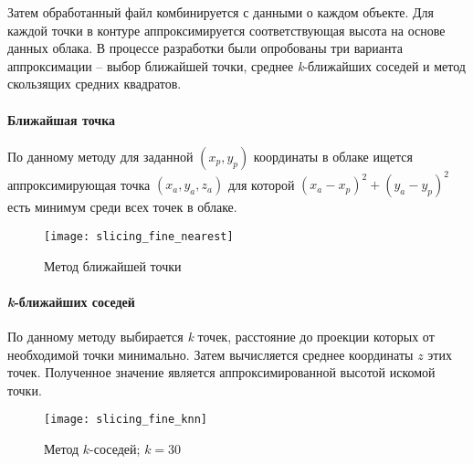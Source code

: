          Затем обработанный файл комбинируется с данными о каждом объекте. Для каждой точки в контуре аппроксимируется соответствующая высота на основе данных облака. В процессе разработки были опробованы три варианта аппроксимации -- выбор ближайшей точки, среднее \textit{k}-ближайших соседей и метод скользящих средних квадратов.
         
         \paragraph{Ближайшая точка}
         По данному методу для заданной $ (x_p,y_p) $ координаты в облаке ищется аппроксимирующая точка $ (x_a, y_a, z_a) $ для которой $ (x_a-x_p)^2 + (y_a-y_p)^2 $ есть минимум среди всех точек в облаке.
         
         \begin{figure}[H]
             \centering
             \texttt{[image: slicing\_fine\_nearest]}
             \caption{Метод ближайшей точки}
             \label{pic:slicing_nearest}
         \end{figure}
         
         \paragraph{\textit{k}-ближайших соседей}
         По данному методу выбирается \textit{k} точек, расстояние до проекции которых от необходимой точки минимально. Затем вычисляется среднее координаты $ z $ этих точек. Полученное значение является аппроксимированной высотой искомой точки.
         
         \begin{figure}[H]
             \centering
             \texttt{[image: slicing\_fine\_knn]}
             \caption{Метод $ k $-соседей; $ k=30 $}
             \label{pic:slicing_knn}
         \end{figure}
         
